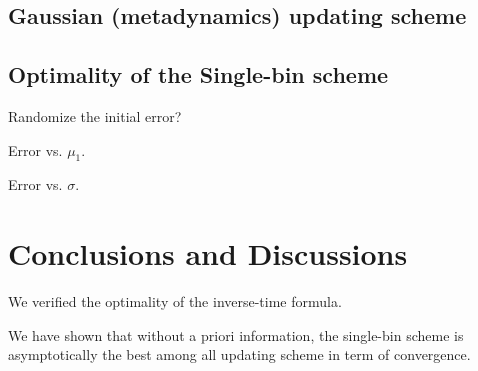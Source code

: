 \documentclass[reprint]{revtex4-1}
\begin{document}
\subsection{Gaussian (metadynamics) updating scheme}


\subsection{Optimality of the Single-bin scheme}

Randomize the initial error?

Error vs. $\mu_1$.

Error vs. $\sigma$.


\section{\label{sec:conclusion}
Conclusions and Discussions}


We verified the optimality of the inverse-time formula.

We have shown that
without a priori information,
the single-bin scheme is asymptotically
the best among all updating scheme
in term of convergence.



\end{document}
